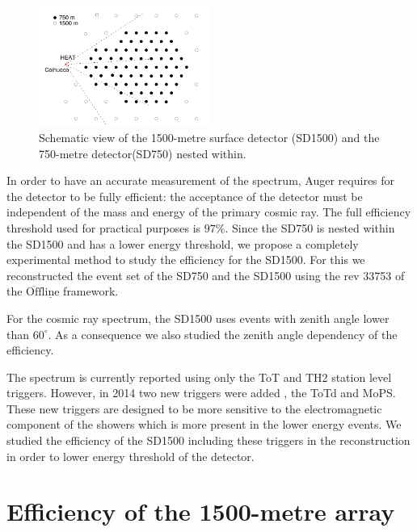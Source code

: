 \documentclass[12pt,a4paper]{article}
\begin{document}
\begin{figure}[]
    \begin{center}
        \includegraphics[width=0.5\textwidth]{plots/SD.pdf}  
        \caption{Schematic view of the 1500-metre surface detector (SD1500) and the 750-metre detector(SD750) nested within.
        \label{fig:SD}}
        \vspace{-0.5cm}
    \end{center}
\end{figure} 

In order to have an accurate measurement of the spectrum, Auger requires for the detector to be fully efficient: the acceptance of the detector must be independent of the mass and energy of the primary cosmic ray. The full efficiency threshold used for practical purposes is $97\%$.
Since the SD750 is nested within the SD1500 and has a lower energy threshold, we propose a completely experimental method to study the efficiency for the SD1500. For this we reconstructed the event set of the SD750 and the SD1500 using the rev 33753 of the $\mathrm{\overline{Off}\underline{line}}$ framework. 

For the cosmic ray spectrum, the SD1500 uses events with zenith angle lower than $60^{\circ}$. As a consequence we also studied the zenith angle dependency of the efficiency.

The spectrum is currently reported using only the ToT and TH2 station level triggers. However, in 2014 two new triggers were added \cite{Coleman}, the ToTd and MoPS. These new triggers are designed to be more sensitive to the electromagnetic component of the showers which is more present in the lower energy events. We studied the efficiency of the SD1500 including these triggers in the reconstruction in order to lower energy threshold of the detector.


\section{Efficiency of the 1500-metre array}
\label{sec:efficiency}
\end{document}

